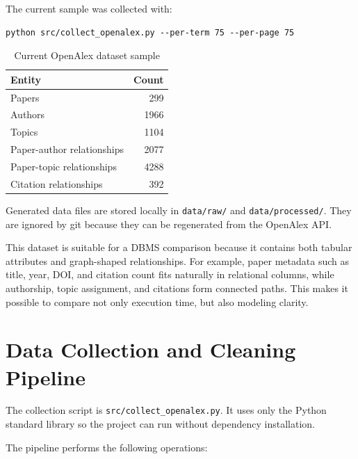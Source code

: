 \documentclass[11pt]{article}
\begin{document}
The current sample was collected with:

\begin{verbatim}
python src/collect_openalex.py --per-term 75 --per-page 75
\end{verbatim}

\begin{table}[h]
\centering
\caption{Current OpenAlex dataset sample}
\label{tab:dataset-counts}
\begin{tabular}{|l|r|}
\hline
\textbf{Entity} & \textbf{Count} \\
\hline
Papers & 299 \\
Authors & 1966 \\
Topics & 1104 \\
Paper-author relationships & 2077 \\
Paper-topic relationships & 4288 \\
Citation relationships & 392 \\
\hline
\end{tabular}
\end{table}

Generated data files are stored locally in \texttt{data/raw/} and \texttt{data/processed/}.
They are ignored by git because they can be regenerated from the OpenAlex API.

This dataset is suitable for a DBMS comparison because it contains both tabular attributes and graph-shaped relationships.
For example, paper metadata such as title, year, DOI, and citation count fits naturally in relational columns, while authorship, topic assignment, and citations form connected paths.
This makes it possible to compare not only execution time, but also modeling clarity.

\section{Data Collection and Cleaning Pipeline}

The collection script is \texttt{src/collect\_openalex.py}.
It uses only the Python standard library so the project can run without dependency installation.

The pipeline performs the following operations:
\end{document}
